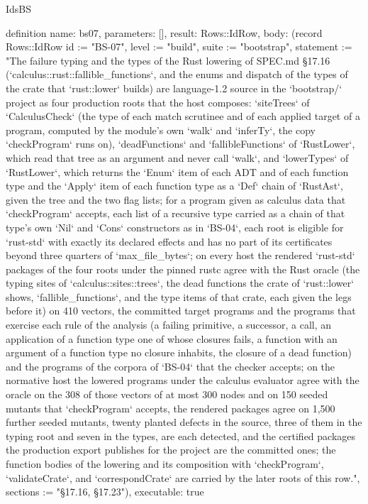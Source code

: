 \begin{lexlean}{IdsBS}
\begin{semanticmodule}
definition{
  name: bs07,
  parameters: [],
  result: Rows::IdRow,
  body: (record Rows::IdRow {id := "BS-07", level := "build", suite := "bootstrap", statement := "The failure typing and the types of the Rust lowering of SPEC.md §17.16 (`calculus::rust::fallible_functions`, and the enums and dispatch of the types of the crate that `rust::lower` builds) are language-1.2 source in the `bootstrap/` project as four production roots that the host composes: `siteTrees` of `CalculusCheck` (the type of each match scrutinee and of each applied target of a program, computed by the module's own `walk` and `inferTy`, the copy `checkProgram` runs on), `deadFunctions` and `fallibleFunctions` of `RustLower`, which read that tree as an argument and never call `walk`, and `lowerTypes` of `RustLower`, which returns the `Enum` item of each ADT and of each function type and the `Apply` item of each function type as a `Def` chain of `RustAst`, given the tree and the two flag lists; for a program given as calculus data that `checkProgram` accepts, each list of a recursive type carried as a chain of that type's own `Nil` and `Cons` constructors as in `BS-04`, each root is eligible for `rust-std` with exactly its declared effects and has no part of its certificates beyond three quarters of `max_file_bytes`; on every host the rendered `rust-std` packages of the four roots under the pinned rustc agree with the Rust oracle (the typing sites of `calculus::sites::trees`, the dead functions the crate of `rust::lower` shows, `fallible_functions`, and the type items of that crate, each given the legs before it) on 410 vectors, the committed target programs and the programs that exercise each rule of the analysis (a failing primitive, a successor, a call, an application of a function type one of whose closures fails, a function with an argument of a function type no closure inhabits, the closure of a dead function) and the programs of the corpora of `BS-04` that the checker accepts; on the normative host the lowered programs under the calculus evaluator agree with the oracle on the 308 of those vectors of at most 300 nodes and on 150 seeded mutants that `checkProgram` accepts, the rendered packages agree on 1,500 further seeded mutants, twenty planted defects in the source, three of them in the typing root and seven in the types, are each detected, and the certified packages the production export publishes for the project are the committed ones; the function bodies of the lowering and its composition with `checkProgram`, `validateCrate`, and `correspondCrate` are carried by the later roots of this row.", sections := "§17.16, §17.23"}),
  executable: true
}


\end{semanticmodule}
\end{lexlean}
